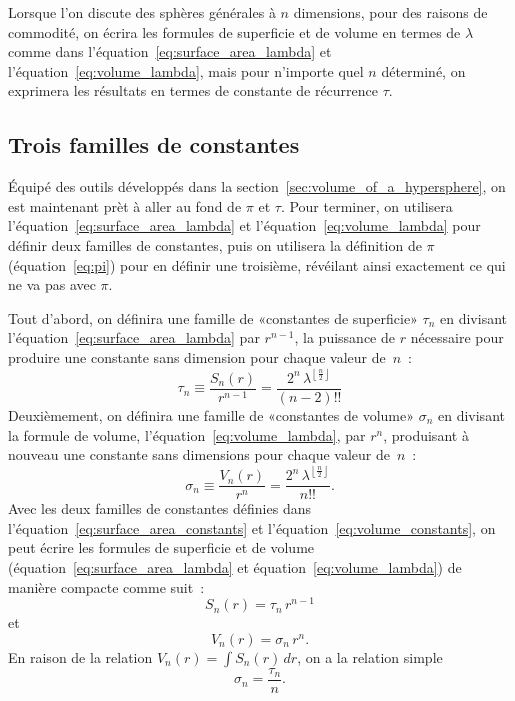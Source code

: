 Lorsque l'on discute des sphères générales à $n$ dimensions, pour des raisons de
commodité, on écrira les formules de superficie et de volume en termes de
$\lambda$ comme dans l'équation~\eqref{eq:surface_area_lambda} et
l'équation~\eqref{eq:volume_lambda}, mais pour n'importe quel $n$ déterminé, on
exprimera les résultats en termes de constante de récurrence $\tau$.




  \subsection{Trois familles de constantes} %
  \label{sec:three_families_of_constants}

Équipé des outils développés dans la section~\ref{sec:volume_of_a_hypersphere},
on est maintenant prèt à aller au fond de $\pi$ et $\tau$. Pour terminer, on
utilisera l'équation~\eqref{eq:surface_area_lambda} et
l'équation~\eqref{eq:volume_lambda} pour définir deux familles de constantes,
puis on utilisera la définition de $\pi$ (équation~\eqref{eq:pi}) pour en
définir une troisième, révéilant ainsi exactement ce qui ne va pas avec $\pi$.

Tout d'abord, on définira une famille de «\ns constantes de superficie\ns » $\tau_n$
en divisant \linebreak l'équation~\eqref{eq:surface_area_lambda} par $r^{n-1}$,
la puissance de $r$ nécessaire pour produire une constante sans dimension pour
chaque valeur de~$n$~:
\begin{equation}
\label{eq:surface_area_constants}
\tau_n \equiv \frac{S_n(r)}{r^{n-1}} = \frac{2^n\,\lambda^{\left\lfloor \frac{n}{2} \right\rfloor}}{(n-2)!!}
\end{equation}
Deuxièmement, on définira une famille de «\ns constantes de volume\ns » $\sigma_n$
en divisant la formule de volume, l'équation~\eqref{eq:volume_lambda}, par
$r^n$, produisant à nouveau une constante sans dimensions pour chaque valeur
de~$n$~:
\begin{equation}
\label{eq:volume_constants}
\sigma_n \equiv \frac{V_n(r)}{r^n} = \frac{2^n\,\lambda^{\left\lfloor \frac{n}{2} \right\rfloor}}{n!!}.
\end{equation}
Avec les deux familles de constantes définies dans
l'équation~\eqref{eq:surface_area_constants} et
l'équation~\eqref{eq:volume_constants}, on peut écrire les formules de
superficie et de volume (équation~\eqref{eq:surface_area_lambda} et
équation~\eqref{eq:volume_lambda}) de manière compacte comme suit~:
\[ S_n(r) = \tau_n\,r^{n-1} \]
et
\[ V_n(r) = \sigma_n\,r^n. \]
En raison de la relation $V_n(r) = \int S_n(r)\,dr$, on a la relation simple
\[
\sigma_n = \frac{\tau_n}{n}.
\]

